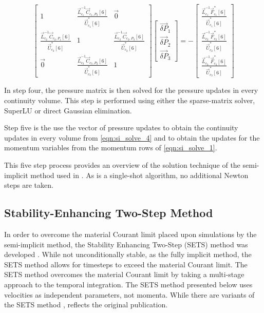   \begin{equation}
 \label{eqn:si_pressure_matrix}
 \begin{bmatrix} 
 1 & \frac{\vec{L}^{-1}_{c_1}\vec{C}_{c_1,P_2}[6]}{\vec{U}^{*}_{c_1}[6]} & \vec{0} \\
 \frac{\vec{L}^{-1}_{c_2}\vec{C}_{c_2,P_1}[6]}{\vec{U}^{*}_{c_2}[6]} & 1 & \frac{\vec{L}^{-1}_{c_2}\vec{C}_{c_2,P_3}[6]}{\vec{U}^{*}_{c_2}[6]} \\
 \vec{0}           & \frac{\vec{L}^{-1}_{c_3}\vec{C}_{c_3,P_2}[6]}{\vec{U}^{*}_{c_3}[6]} & 1
 \end{bmatrix} \begin{bmatrix}
 \vec{\delta P}_{1} \\
 \vec{\delta P}_{2} \\
 \vec{\delta P}_{3}
\end{bmatrix}  = -\begin{bmatrix}
 \frac{\vec{L}^{-1}_{c_1}\vec{F}^{*}_{c_1}[6]}{\vec{U}^{*}_{c_1}[6]} \\
 \frac{\vec{L}^{-1}_{c_2}\vec{F}^{*}_{c_2}[6]}{\vec{U}^{*}_{c_2}[6]} \\
 \frac{\vec{L}^{-1}_{c_3}\vec{F}^{*}_{c_3}[6]}{\vec{U}^{*}_{c_3}[6]}
\end{bmatrix}
 \end{equation}

In step four, the pressure matrix is then solved for the pressure updates in every continuity volume.
This step is performed using either the sparse-matrix solver, SuperLU \cite{Li1999} or direct Gaussian elimination. 

Step five is the use the vector of pressure updates to obtain the continuity updates in every volume from \eqref{eqn:si_solve_4} and to obtain the updates for the momentum variables from the momentum rows of \eqref{eqn:si_solve_1}.

This five step process provides an overview of the solution technique of the semi-implicit method used in \cobra{}.
As \cobra{} is a single-shot algorithm, no additional Newton steps are taken.

\subsection{Stability-Enhancing Two-Step Method} 
\label{subsect:numerics_sets}
In order to overcome the material Courant limit placed upon simulations by the semi-implicit method, the Stability Enhancing Two-Step (SETS) method was developed \cite{Mahaffy1982}.
While not unconditionally stable, as the fully implicit method, the SETS method allows for timesteps to exceed the material Courant limit.
The SETS method overcomes the material Courant limit by taking a multi-stage approach to the temporal integration.
The SETS method presented below uses velocities as independent parameters, not momenta.
While there are variants of the SETS method \cite{TRACE},  reflects the original publication.

